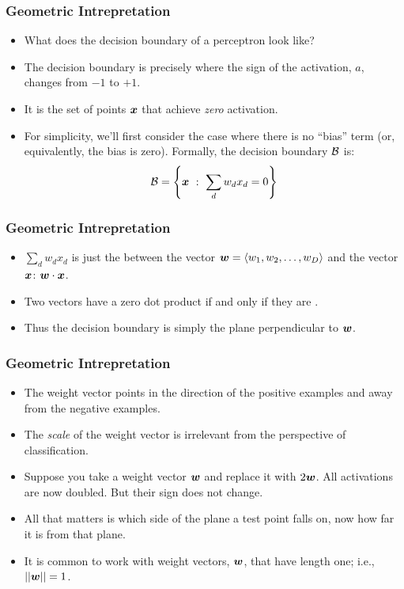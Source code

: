 \documentclass[trans]{beamer}
\begin{document}
\begin{frame}
  \frametitle{Geometric Intrepretation}
\begin{itemize}
\item
What does the
decision boundary of a perceptron look like?  
\item The decision boundary
is precisely where the sign of the activation, $a$, changes from $-1$
to $+1$.  
\item It is the set of points ${\boldsymbol{x}}$ that achieve
\emph{zero} activation.
\item
  For simplicity, we'll first consider the case where there
is no ``bias'' term (or, equivalently, the bias is zero).  Formally,
the decision boundary $\mathcal{B}$ is:
\begin{equation}
\mathcal{B} = \left\{ {\boldsymbol{x}} ~:~ \sum_d w_d x_d = 0 \right\}
\end{equation}
\end{itemize}
\end{frame}
\begin{frame}
  \frametitle{Geometric Intrepretation}
\begin{itemize}
\item
$\sum_d w_d x_d$ is
just the  between the vector ${\boldsymbol{w}} = \langle w_1,
w_2, \dots, w_D \rangle$ and the vector ${\boldsymbol{x}}$: 
${\boldsymbol{w}} \cdot {\boldsymbol{x}}$.  
\item  Two vectors have a zero dot product if and only if
they are .  
\item Thus the decision boundary is simply the plane
perpendicular to ${\boldsymbol{w}}$.
\end{itemize}
\end{frame}

\begin{frame}
  \frametitle{Geometric Intrepretation}
\begin{itemize}
\item
 The weight vector points in the direction of the positive examples
and away from the negative examples.
\item The \emph{scale} of the weight vector is
irrelevant from the perspective of classification. 
\item Suppose you take a
weight vector ${\boldsymbol{w}}$ and replace it with $2 {\boldsymbol{w}}$.  All activations are
now doubled.  But their sign does not change. 
\item All that matters is which side of the plane
a test point falls on, now how far it is from that plane. 
\item It is common to work with 
weight vectors, ${\boldsymbol{w}}$, that have length one; i.e., $\left\vert\left\vert {\boldsymbol{w}} \right\vert\right\vert = 1$.

\end{itemize}
\end{frame}
\end{document}
